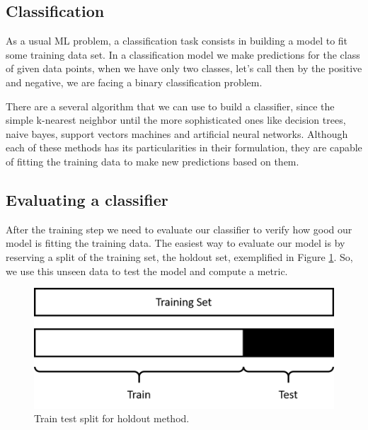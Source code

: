 	\subsection{Classification}
	
	As a usual ML problem, a classification task consists in building a model to fit some training data set. In a classification model we make predictions for the class of given data points, when we have only two classes, let's call then by the positive and negative, we are facing a binary classification problem.
	
	There are a several algorithm that we can use to build a classifier, since the simple k-nearest neighbor until the more sophisticated ones like decision trees, naive bayes, support vectors machines and artificial neural networks. Although each of these methods has its particularities in their formulation, they are capable of fitting the training data to make new predictions based on them.
	
	
		
	\subsection{Evaluating a classifier}
	
	After the training step we need to evaluate our classifier to verify how good our model is fitting the training data. The easiest way to evaluate our model is by reserving a split of the training set, the holdout set, exemplified in Figure \ref{fig:holdout-evaluate}. So, we use this unseen data to test the model and compute a metric.
	
	\begin{figure}[h!]
		\centering
		\includegraphics[width=0.5\linewidth]{01.Chapters/02.Background/holdout-evaluate}
		\caption{Train test split for holdout method.}
		\label{fig:holdout-evaluate}
	\end{figure}

